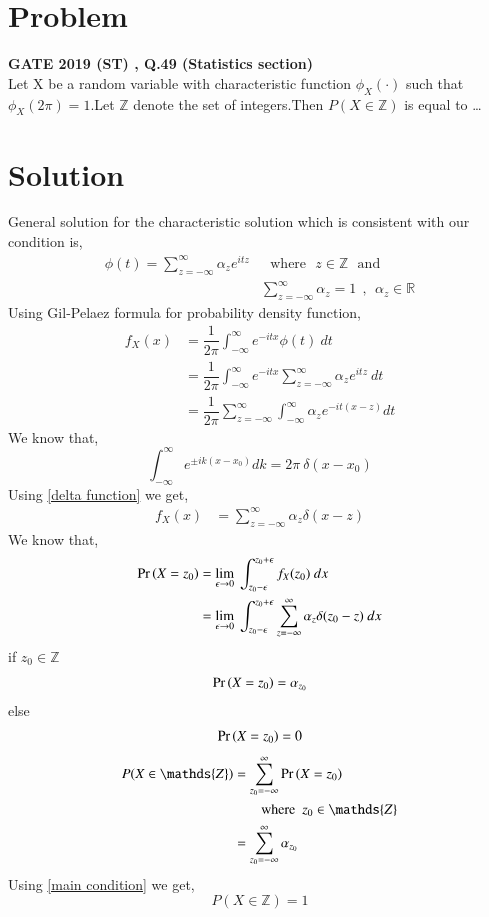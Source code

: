 \documentclass[journal,12pt,twocolumn]{IEEEtran}
\begin{document}
\section{Problem}
\textbf{GATE 2019 (ST) , Q.49 (Statistics section)}\\
   Let X be a random variable with characteristic function $\phi_X(\cdot)$ such that $\phi_X(2 \pi)=1$.Let $\mathds{Z}$ denote the set of integers.Then $P(X \in \mathds{Z})$ is equal to \ldots
\section{Solution}
  General solution for the characteristic solution which is consistent with our condition is,
  \begin{align}
      \phi(t)=\sum_{z=-\infty}^{\infty}\alpha_ze^{itz}& \text{~~where~~} z \in \mathds{Z} \text{~~and}\\
      &\sum_{z=-\infty}^{\infty}\alpha_z=1~~,~~\alpha_z \in \mathds{R} \label{main condition}
  \end{align}
  Using Gil-Pelaez formula for probability density function,
  \begin{align}
      f_X(x)&=\dfrac{1}{2\pi}\int_{-\infty}^\infty e^{-itx}\phi(t)~dt\\
      &=\dfrac{1}{2\pi}\int_{-\infty}^\infty e^{-itx}\sum_{z=-\infty}^{\infty}\alpha_ze^{itz}~dt\\
      &=\dfrac{1}{2\pi}\sum_{z=-\infty}^{\infty}\int_{-\infty}^\infty\alpha_ze^{-it(x-z)}dt
\end{align}
We know that,
\begin{equation}
    \int_{-\infty}^{\infty}e^{\pm ik(x-x_{0})}dk=2\pi~\delta(x-x_{0}) \label{delta function}
\end{equation}
Using \eqref{delta function} we get,
\begin{align}
     f_X(x) &=\sum_{z=-\infty}^{\infty}\alpha_z \delta(x-z)
\end{align}
  We know that,
  \begin{align}
      \Pr\left(X=z_0\right)&=\lim_{\epsilon\rightarrow 0}~\int_{z_0-\epsilon}^{z_0+\epsilon} f_X(z_0)~dx\\
      &=\lim_{\epsilon\rightarrow 0}~\int_{z_0-\epsilon}^{z_0+\epsilon}\sum_{z=-\infty}^{\infty}\alpha_{z}\delta(z_0-z)~dx
\end{align}
if $z_0 \in \mathds{Z}$
\begin{align}
      \Pr\left(X=z_0\right) =\alpha_{z_0}
\end{align}
else
\begin{align}
        \Pr\left(X=z_0\right) =0
\end{align}
\begin{align}
      P(X \in \mathds{Z})&=\sum_{z_0=-\infty}^{\infty}\pr{X=z_0}\nonumber\\&~~~~~~~~\text{where~~} z_0 \in \mathds{Z}\\
      &=\sum_{z_0=-\infty}^{\infty}\alpha_{z_0}
  \end{align}
  Using \eqref{main condition} we get,
  $$ P(X \in \mathds{Z})=1$$
\end{document}
